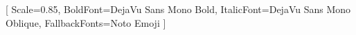 
\usepackage{fontspec}
\usepackage{unicode-math}
\usepackage{dirtree}  %

\setmainfont{DejaVu Serif}

\setmonofont{DejaVu Sans Mono}[
  Scale=0.85,
  BoldFont={DejaVu Sans Mono Bold},
  ItalicFont={DejaVu Sans Mono Oblique},
  FallbackFonts={Noto Emoji}
]

\setsansfont{DejaVu Sans}

\setlength{\emergencystretch}{3em}
